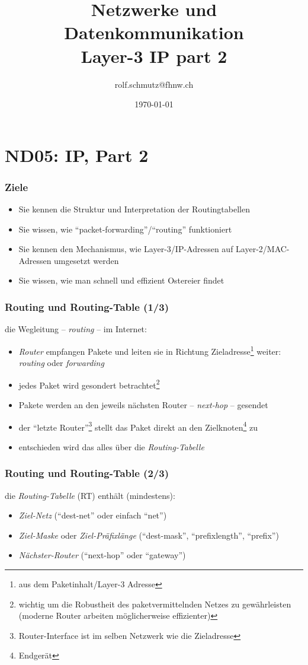 \documentclass[ignorenonframetext]{beamer}
\date{\today}
\author{rolf.schmutz@fhnw.ch}
\institute{FHNW}
\title {Netzwerke und Datenkommunikation\\Layer-3 IP part 2}
\begin{document}

\section{ND05: IP, Part 2}

\begin{frame}
  \titlepage
\end{frame}

\begin{frame}
\frametitle{Ziele}
\begin{itemize}
	\item{Sie kennen die Struktur und Interpretation der Routingtabellen}
	\item{Sie wissen, wie ``packet-forwarding''/``routing'' funktioniert}
	\item{Sie kennen den Mechanismus, wie Layer-3/IP-Adressen auf Layer-2/MAC-Adressen umgesetzt werden}
	\item{Sie wissen, wie man schnell und effizient Ostereier findet}
\end{itemize}
\end{frame}

\begin{frame}
\frametitle{Routing und Routing-Table (1/3)}
die Wegleitung -- {\em routing} -- im Internet:
	\begin{itemize}
	\item{{\em Router} empfangen Pakete und leiten sie in Richtung Zieladresse\footnote{aus dem Paketinhalt/Layer-3 Adresse} weiter: {\em routing} oder {\em forwarding}}
	\item{jedes Paket wird gesondert betrachtet\footnote{wichtig um die Robustheit des paketvermittelnden Netzes zu gew\"ahrleisten (moderne Router arbeiten m\"oglicherweise effizienter)}}
	\item{Pakete werden an den jeweils n\"achsten Router -- {\em next-hop} -- gesendet}
	\item{der ``letzte Router''\footnote{Router-Interface ist im selben Netzwerk wie die Zieladresse} stellt das Paket direkt an den Zielknoten\footnote{Endger\"at} zu}
	\item{entschieden wird das alles \"uber die {\em Routing-Tabelle}}
\end{itemize}
\end{frame}

\begin{frame}
\frametitle{Routing und Routing-Table (2/3)}
die {\em Routing-Tabelle} (RT) enth\"alt (mindestens):
\begin{itemize}
	\item{{\em Ziel-Netz} {\small (``dest-net'' oder einfach ``net'')}}
	\item{{\em Ziel-Maske} oder {\em Ziel-Pr\"afixl\"ange} {\small (``dest-mask'', ``prefixlength'', ``prefix'')}}
	\item{{\em N\"achster-Router} {\small (``next-hop'' oder ``gateway'')}}
\end{itemize}
\end{frame}
\end{document}
